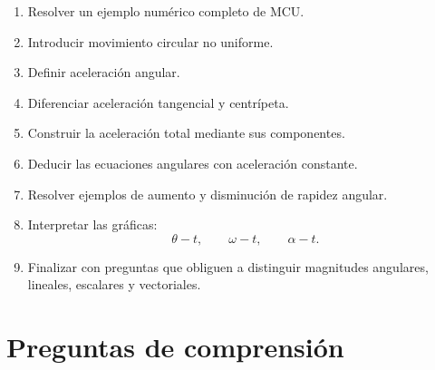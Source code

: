 \begin{notapedagogica}
\begin{enumerate}
    \item Resolver un ejemplo numérico completo de MCU.

    \item Introducir movimiento circular no uniforme.

    \item Definir aceleración angular.

    \item Diferenciar aceleración tangencial y centrípeta.

    \item Construir la aceleración total mediante sus componentes.

    \item Deducir las ecuaciones angulares con aceleración constante.

    \item Resolver ejemplos de aumento y disminución de rapidez angular.

    \item Interpretar las gráficas:
    \[
    \theta-t,\qquad
    \omega-t,\qquad
    \alpha-t.
    \]

    \item Finalizar con preguntas que obliguen a distinguir magnitudes
    angulares, lineales, escalares y vectoriales.

\end{enumerate}

\end{notapedagogica}


\section{Preguntas de comprensión}

